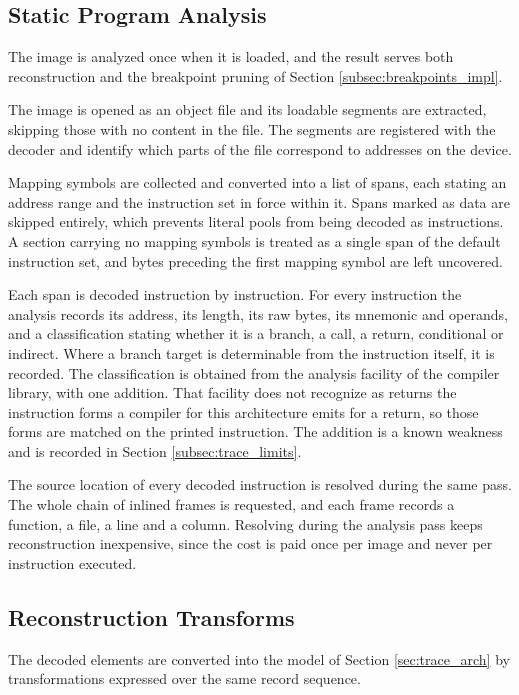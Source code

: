 \subsection{Static Program Analysis}
The image is analyzed once when it is loaded, and the result serves both reconstruction and the breakpoint pruning of Section \ref{subsec:breakpoints_impl}.

The image is opened as an object file and its loadable segments are extracted, skipping those with no content in the file. The segments are registered with the decoder and identify which parts of the file correspond to addresses on the device.

Mapping symbols are collected and converted into a list of spans, each stating an address range and the instruction set in force within it. Spans marked as data are skipped entirely, which prevents literal pools from being decoded as instructions. A section carrying no mapping symbols is treated as a single span of the default instruction set, and bytes preceding the first mapping symbol are left uncovered.

Each span is decoded instruction by instruction. For every instruction the analysis records its address, its length, its raw bytes, its mnemonic and operands, and a classification stating whether it is a branch, a call, a return, conditional or indirect. Where a branch target is determinable from the instruction itself, it is recorded. The classification is obtained from the analysis facility of the compiler library, with one addition. That facility does not recognize as returns the instruction forms a compiler for this architecture emits for a return, so those forms are matched on the printed instruction. The addition is a known weakness and is recorded in Section \ref{subsec:trace_limits}.

The source location of every decoded instruction is resolved during the same pass. The whole chain of inlined frames is requested, and each frame records a function, a file, a line and a column. Resolving during the analysis pass keeps reconstruction inexpensive, since the cost is paid once per image and never per instruction executed.

\subsection{Reconstruction Transforms}
The decoded elements are converted into the model of Section \ref{sec:trace_arch} by transformations expressed over the same record sequence.

